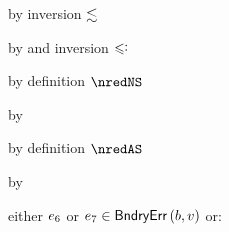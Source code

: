 {\begin{lamportproof*}
    \begin{pfproof}
        \begin{pfproof}
            \begin{pfproof}
              by inversion $\lesssim$
            \end{pfproof}
            \begin{pfproof}
              by  and inversion $\subteq$
            \end{pfproof}
            \begin{pfproof}
              by definition $\nredNS$
            \end{pfproof}
            \begin{pfproof}
              by 
            \end{pfproof}
            \begin{pfproof}
              by definition $\nredAS$
            \end{pfproof}
            \begin{pfproof}
              by 
            \end{pfproof}
          \qedstep
            \begin{pfproof}
              either $e_6$ or $e_7 \in \mathsf{BndryErr}\,(b, v)$ or:

\end{pfproof}
\end{pfproof}
\end{pfproof}
\end{lamportproof*}}
